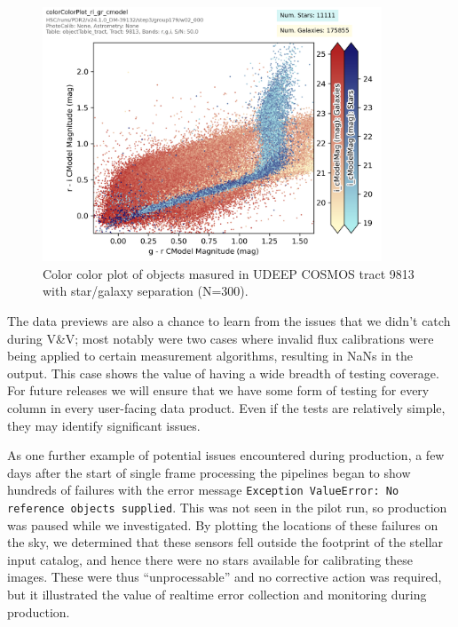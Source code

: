  \begin{figure}
 \includegraphics[width=0.9\textwidth]{colorColor9813.png}
	 \caption{Color color plot of objects masured in UDEEP COSMOS tract 9813 with star/galaxy separation (N=300).  \label{fig:colorcolor}}
 \end{figure}

The data previews are also a chance to learn from the issues that we didn’t catch during V\&V; most
notably were two cases where invalid flux calibrations were being applied to certain measurement
algorithms, resulting in NaNs in the output. This case shows the value of having a wide breadth of
testing coverage. For future releases we will ensure that we have some form of testing for every
column in every user-facing data product. Even if the tests are relatively simple, they may identify
significant issues.

As one further example of potential issues encountered during production, a few days after the start
of single frame processing the pipelines began to show hundreds of failures with the error message
\texttt{Exception ValueError: No reference objects supplied}. This was not seen in the pilot run, so
production was paused while we investigated. By plotting the locations of these failures on the sky,
we determined that these sensors fell outside the footprint of the stellar input catalog, and hence
there were no stars available for calibrating these images. These were thus “unprocessable” and no
corrective action was required, but it illustrated the value of realtime error collection and
monitoring during production.

